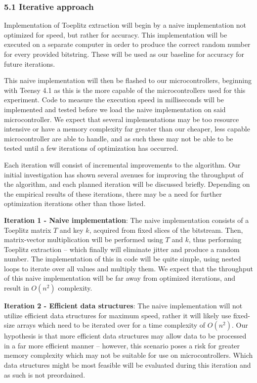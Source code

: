 \subsubsection{5.1 Iterative approach}\label{iterative-approach}

Implementation of Toeplitz extraction will begin by a naive implementation not optimized for speed, but rather for accuracy. This implementation will be executed on a separate computer in order to produce the correct random number for every provided bitstring. These will be used as our baseline for accuracy for future iterations.

This naive implementation will then be flashed to our microcontrollers, beginning with Teensy 4.1 as this is the more capable of the microcontrollers used for this experiment. Code to measure the execution speed in milliseconds will be implemented and tested before we load the naive implementation on said microcontroller. We expect that several implementations may be too resource intensive or have a memory complexity far greater than our cheaper, less capable microcontroller are able to handle, and as such these may not be able to be tested until a few iterations of optimization has occurred.

Each iteration will consist of incremental improvements to the algorithm. Our initial investigation has shown several avenues for improving the throughput of the algorithm, and each planned iteration will be discussed briefly. Depending on the empirical results of these iterations, there may be a need for further optimization iterations other than those listed.

\textbf{Iteration 1 - Naive implementation}: The naive implementation consists of a Toeplitz matrix \(T\) and key \(k\), acquired from fixed slices of the bitstream. Then, matrix-vector multiplication will be performed using \(T\) and \(k\), thus performing Toeplitz extraction -- which finally will eliminate jitter and produce a random number. The implementation of this in code will be quite simple, using nested loops to iterate over all values and multiply them. We expect that the throughput of this naive implementation will be far away from optimized iterations, and result in \(O(n^2)\) complexity.

\textbf{Iteration 2 - Efficient data structures}: The naive implementation will not utilize efficient data structures for maximum speed, rather it will likely use fixed-size arrays which need to be iterated over for a time complexity of \(O(n^2)\). Our hypothesis is that more efficient data structures may allow data to be processed in a far more efficient manner -- however, this scenario poses a risk for greater memory complexity which may not be suitable for use on microcontrollers. Which data structures might be most feasible will be evaluated during this iteration and as such is not preordained.


